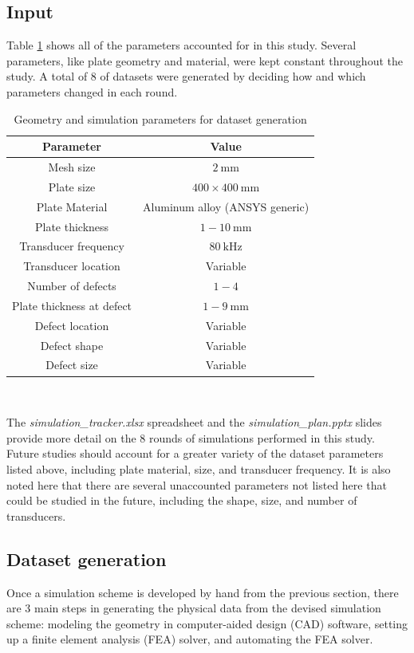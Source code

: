 \documentclass[11pt,letterpaper]{article}
\begin{document}
		\subsection{Input}
		Table \ref{table:input} shows all of the parameters accounted for in this study. Several parameters, like plate geometry and material, were kept constant throughout the study. A total of 8  of datasets were generated by deciding how and which parameters changed in each round.
		\begin{table}[H]
		\centering
		\captionsetup{margin=1cm}
		\caption{Geometry and simulation parameters for dataset generation}
		\renewcommand{\arraystretch}{1.5}
		\begin{tabular}{| c | c |}
		\hline
	 	\textbf{Parameter} & \textbf{Value} \\ \hline \hline
	 	Mesh size & $2\ \si{\milli\metre}$ \\ \hline
		Plate size & $400\times 400\ \si{\milli\metre}$ \\ \hline
		Plate Material & Aluminum alloy (ANSYS generic) \\ \hline
		Plate thickness & $1-10\ \si{\milli\metre}$ \\ \hline
		Transducer frequency & $80\ \si{\kilo\hertz}$ \\ \hline
		Transducer location & Variable \\ \hline
		Number of defects & $1-4$ \\ \hline
		Plate thickness at defect & $1-9\ \si{\milli\metre}$ \\ \hline
		Defect location & Variable \\ \hline
		Defect shape & Variable \\ \hline
		Defect size & Variable \\ \hline
		\end{tabular}\\
		\label{table:input}
		\end{table}
		The \textit{simulation\_tracker.xlsx} spreadsheet and the \textit{simulation\_plan.pptx} slides provide more detail on the 8 rounds of simulations performed in this study. Future studies should account for a greater variety of the dataset parameters listed above, including plate material, size, and transducer frequency. It is also noted here that there are several unaccounted parameters not listed here that could be studied in the future, including the shape, size, and number of transducers.
		\subsection{Dataset generation}
		Once a simulation scheme is developed by hand from the previous  section, there are 3 main steps in generating the physical data from the devised simulation scheme: modeling the geometry in computer-aided design (CAD) software, setting up a finite element analysis (FEA) solver, and automating the FEA solver.
\end{document}
